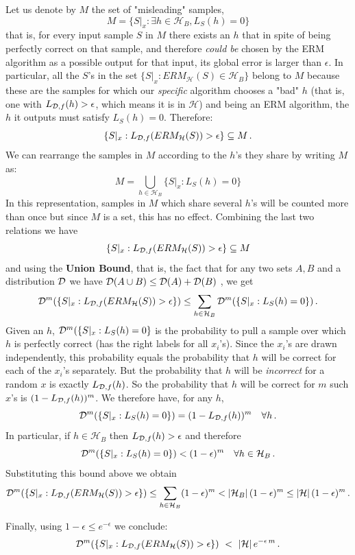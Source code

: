 \documentclass[11pt]{article}
\newcommand{\Hc}{\mathcal{H}}
\begin{document}
Let us denote by $M$ the set of "misleading" samples,
\[M = \{S|_x : \exists h \in \Hc_B, L_S(h)=0\} \]
%
that is, for every input sample $S$ in $M$ there exists an $h$ that in spite of being perfectly correct on that sample, and therefore \textit{could be} chosen by the ERM algorithm as a possible output for that input, its global error is larger than $\epsilon$. In particular, all the $S$'s in the set $\{ S|_x : ERM_{\Hc}(S)\in \Hc_B \}$ belong to $M$ because these are the samples for which our \textit{specific} algorithm chooses a "bad" $h$ (that is, one with $L_{\mathcal{D},f}(h) > \epsilon$, which means it is in $\Hc$) and being an ERM algorithm, the $h$ it outputs must satisfy $L_S(h)=0$. Therefore:
%
\[\{S|_x : L_{\D,f}(ERM_\Hc(S)) > \epsilon\} \subseteq M \,.\]
We can rearrange the samples in  $M$ according to the $h$'s they share by writing $M$ as:
\[ M = \bigcup_{h \in \Hc_B} \{ S|_x : L_S(h) = 0 \}\]
In this representation, samples in $M$ which share several $h$'s will be counted more than once but since $M$ is a set, this has no effect.
Combining the last two relations we have
\[\{S|_x : L_{\D,f}(ERM_\Hc(S)) > \epsilon\} \subseteq M \]
and using the \textbf{Union Bound}, that is, the fact that for any two sets $A,B$ and a distribution $\mathcal{D}$ we have $\mathcal{D}(A \cup B) \le \mathcal{D}(A) + \mathcal{D}(B) ~$, we get
$$\D^m(\{ S|_x : L_{\D,f}(ERM_\Hc(S)) > \epsilon \}) \le \sum_{h \in \Hc_B} \D^m( \{ S|_x : L_S(h) = 0 \} )\,.$$
Given an $h$, $ \mathcal{D}^m( \{ S|_x : L_S(h) = 0 \}$ is the probability to pull a sample over which $h$ is perfectly correct (has the right labels for all $x_i$'s). 
Since the  $x_i$'s are drawn independently, this probability equals the probability that $h$ will be correct for each of the $x_i$'s separately. 
But the probability that $h$ will be \textit{incorrect} for a random $x$ is exactly $L_{\mathcal{D},f}(h)$. So the probability that $h$ will be correct for $m$ such $x$'s is $(1-L_{\mathcal{D},f}(h))^m$. 
We therefore have, for any $h$,
\[ \mathcal{D}^m( \{ S|_x : L_S(h) = 0 \} ) = (1-L_{\mathcal{D},f}(h))^m \quad \forall h \,.\]
In particular, if $h \in \Hc_B$ then $L_{\mathcal{D},f}(h) > \epsilon$ and therefore
\[ \D^m( \{ S|_x : L_S(h) = 0 \} ) < (1-\epsilon)^m \quad \forall h \in \Hc_B \,.\]
Substituting this bound above we obtain
\[ \D^m(\{ S|_x : L_{\D,f}(ERM_\Hc(S)) > \epsilon \}) \le \sum_{h \in \Hc_B} (1-\epsilon)^m < |\Hc_B|\,(1-\epsilon)^m  \le  |\Hc|\,(1-\epsilon)^m \,.\]

Finally, using $1-\epsilon \le e^{-\epsilon}$ we conclude:
\[ \D^m(\{ S|_x : L_{\D,f}(ERM_\Hc(S)) > \epsilon \}) ~<~ |\Hc|\,e^{-\epsilon\,m} \,.\]
\end{document}
